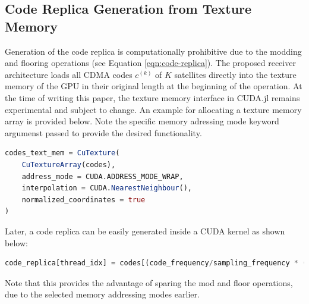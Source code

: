 \documentclass{juliacon}
\begin{document}


\subsection*{Code Replica Generation from Texture Memory}
Generation of the code replica is computationally prohibitive due to the modding and flooring operations (see Equation \ref{eqn:code-replica}). The proposed receiver architecture loads all CDMA codes $c^{(k)}$ of $K$ satellites directly into the texture memory of the GPU in their original length at the beginning of the operation. At the time of writing this paper, the texture memory interface in CUDA.jl remains experimental and subject to change. An example for allocating a texture memory array is provided below. Note the specific memory adressing mode keyword argumenst passed to provide the desired functionality.
\begin{lstlisting}[language = Julia]
codes_text_mem = CuTexture(
    CuTextureArray(codes),
    address_mode = CUDA.ADDRESS_MODE_WRAP,
    interpolation = CUDA.NearestNeighbour(),
    normalized_coordinates = true
)
\end{lstlisting}
Later, a code replica can be easily generated inside a CUDA kernel as shown below:\begin{lstlisting}[language = Julia]
code_replica[thread_idx] = codes[(code_frequency/sampling_frequency * (thread_idx + latest_shift) + start_code_phase) / code_length, prn)]
\end{lstlisting}
Note that this provides the advantage of sparing the mod and floor operations, due to the selected memory addressing modes earlier.
\end{document}
